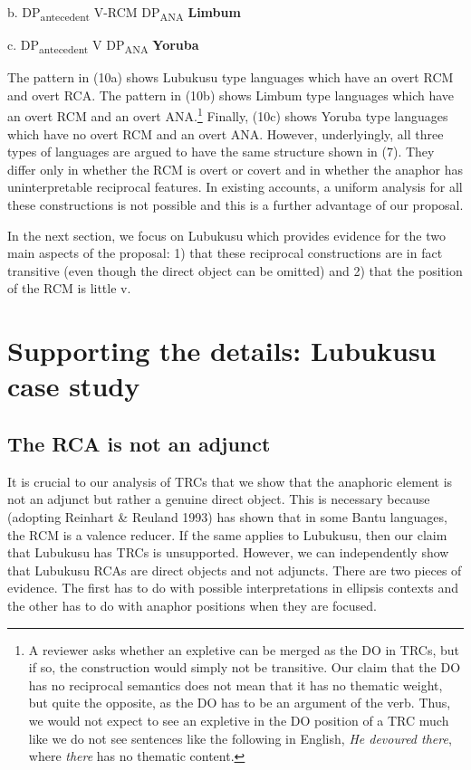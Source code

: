 \documentclass[output=paper]{langsci/langscibook}
\begin{document}
  b.  DP\-\textsubscript{antecedent}      V-RCM  DP\textsubscript{ANA}    \textbf{Limbum}

  c.  DP\-\textsubscript{antecedent}      V    DP\textsubscript{ANA}    \textbf{Yoruba}  

The pattern in (10a) shows Lubukusu type languages which have an overt RCM and overt RCA. The pattern in (10b) shows Limbum type languages which have an overt RCM and an overt ANA.\footnote{ A reviewer asks whether an expletive can be merged as the DO in TRCs, but if so, the construction would simply not be transitive. Our claim that the DO has no reciprocal semantics does not mean that it has no thematic weight, but quite the opposite, as the DO has to be an argument of the verb. Thus, we would not expect to see an expletive in the DO position of a TRC much like we do not see sentences like the following in English, \textit{He devoured there}, where \textit{there} has no thematic content.}   Finally, (10c) shows Yoruba type languages which have no overt RCM and an overt ANA. However, underlyingly, all three types of languages are argued to have the same structure shown in (7). They differ only in whether the RCM is overt or covert and in whether the anaphor has uninterpretable reciprocal features.  In existing accounts, a uniform analysis for all these constructions is not possible and this is a further advantage of our proposal. 

  In the next section, we focus on Lubukusu which provides evidence for the two main aspects of the proposal: 1) that these reciprocal constructions are in fact transitive (even though the direct object can be omitted) and 2) that the position of the RCM is little v.

\section{Supporting the details: Lubukusu case study}
\subsection{The RCA is not an adjunct}

  It is crucial to our analysis of TRCs that we show that the anaphoric element is not an adjunct but rather a genuine direct object. This is necessary because \citet{Mchombo1994} (adopting Reinhart \& Reuland 1993) has shown that in some Bantu languages, the RCM is a valence reducer. If the same applies to Lubukusu, then our claim that Lubukusu has TRCs is unsupported. However, we can independently show that Lubukusu RCAs are direct objects and not adjuncts. There are two pieces of evidence. The first has to do with possible interpretations in ellipsis contexts and the other has to do with anaphor positions when they are focused.
\end{document}
